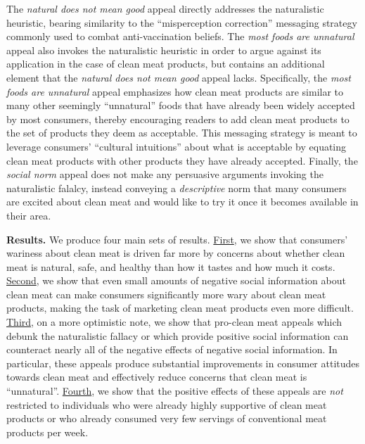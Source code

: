 \documentclass[12pt]{article}
\begin{document}
The \textit{natural does not mean good} appeal directly addresses the naturalistic heuristic, bearing similarity to the ``misperception correction'' messaging strategy commonly used to combat anti-vaccination beliefs. The \textit{most foods are unnatural} appeal also invokes the naturalistic heuristic in order to argue against its application in the case of clean meat products, but contains an additional element that the \textit{natural does not mean good} appeal lacks. Specifically, the \textit{most foods are unnatural} appeal emphasizes how clean meat products are similar to many other seemingly ``unnatural'' foods that have already been widely accepted by most consumers, thereby encouraging readers to add clean meat products to the set of products they deem as acceptable. This messaging strategy is meant to leverage consumers' ``cultural intuitions'' \citep{Miton2015} about what is acceptable by equating clean meat products with other products they have already accepted. Finally, the \textit{social norm} appeal does not make any persuasive arguments invoking the naturalistic falalcy, instead conveying a \textit{descriptive} norm that many consumers are excited about clean meat and would like to try it once it becomes available in their area.


\textbf{Results.} We produce four main sets of results. \underline{First}, we show that consumers' wariness about clean meat is driven far more by concerns about whether clean meat is natural, safe, and healthy than how it tastes and how much it costs. \underline{Second}, we show that even small amounts of negative social information about clean meat can make consumers significantly more wary about clean meat products, making the task of marketing clean meat products even more difficult. \underline{Third}, on a more optimistic note, we show that pro-clean meat appeals which debunk the naturalistic fallacy or which provide positive social information can counteract nearly all of the negative effects of negative social information. In particular, these appeals produce substantial improvements in consumer attitudes towards clean meat and effectively reduce concerns that clean meat is ``unnatural''. \underline{Fourth}, we show that the positive effects of these appeals are \textit{not} restricted to individuals who were already highly supportive of clean meat products or who already consumed very few servings of conventional meat products per week.
\end{document}
